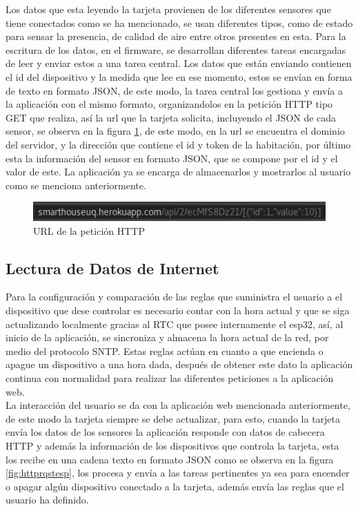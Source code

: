 Los datos que esta leyendo la tarjeta provienen de los diferentes sensores que tiene conectados como se ha mencionado, se usan diferentes tipos, como de estado para sensar la presencia, de calidad de aire entre otros presentes en esta. Para la escritura de los datos, en el firmware, se desarrollan diferentes tareas encargadas de leer y enviar estos a una tarea central. Los datos que están enviando contienen el id del dispositivo y la medida que lee en ese momento, estos se envían en forma de texto en formato JSON, de este modo, la tarea central los gestiona y envía a la aplicación con el mismo formato, organizandolos en la petición HTTP tipo GET que realiza, así la url que la tarjeta solicita, incluyendo el JSON de cada sensor, se observa en la figura \ref{fig:json}, de este modo, en la url se encuentra el dominio del servidor, y la dirección que contiene el id y token de la habitación, por último esta la información del sensor en formato JSON, que se compone por el id y el valor de este. La aplicación ya se encarga de almacenarlos y mostrarlos al usuario como se menciona anteriormente.

\begin{figure}[H]
	\centering
	\caption{URL de la petición HTTP}
	\label{fig:json}
	\includegraphics[width=0.7\linewidth]{Imagenes/JSON}
\end{figure}


\subsection{Lectura de Datos de Internet}

Para la configuración y comparación de las reglas que suministra el usuario a el dispositivo que dese controlar es necesario contar con la hora actual y que se siga actualizando localmente gracias al RTC que posee internamente el esp32, así, al inicio de la aplicación, se sincroniza y almacena la hora actual de la red, por medio del protocolo SNTP. Estas reglas actúan en cuanto a que encienda o apague un dispositivo a una hora dada, después de obtener este dato la aplicación continua con normalidad para realizar las diferentes peticiones a la aplicación web.\\

La interacción del usuario se da con la aplicación web mencionada anteriormente, de este modo la tarjeta siempre se debe actualizar, para esto, cuando la tarjeta envía los datos de los sensores la aplicación responde con datos de cabecera HTTP y además la información de los dispositivos que controla la tarjeta, esta los recibe en una cadena texto en formato JSON como se observa en la figura \ref{fig:httprqstesp}, los procesa y envía a las tareas pertinentes ya sea para encender o apagar algún dispositivo conectado a la tarjeta, además envía las reglas que el usuario ha definido.

